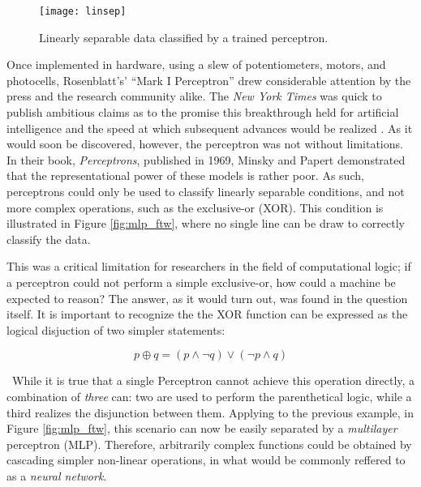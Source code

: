 \begin{figure}
\begin{centering}
\texttt{[image: linsep]}
\caption{Linearly separable data classified by a trained perceptron.}
\label{fig:linsep}
\end{centering}
\end{figure}

Once implemented in hardware, using a slew of potentiometers, motors, and photocells, Rosenblatt's' ``Mark I Perceptron'' drew considerable attention by the press and the research community alike.
The \emph{New York Times} was quick to publish ambitious claims as to the promise this breakthrough held for artificial intelligence and the speed at which subsequent advances would be realized \cite{}.
As it would soon be discovered, however, the perceptron was not without limitations.
In their book, \emph{Perceptrons}, published in 1969, Minsky and Papert demonstrated that the representational power of these models is rather poor.
As such, perceptrons could only be used to classify linearly separable conditions, and not more complex operations, such as the exclusive-or (XOR).
This condition is illustrated in Figure \ref{fig:mlp_ftw}, where no single line can be draw to correctly classify the data.

This was a critical limitation for researchers in the field of computational logic; if a perceptron could not perform a simple exclusive-or, how could a machine be expected to reason?
The answer, as it would turn out, was found in the question itself.
It is important to recognize the the XOR function can be expressed as the logical disjuction of two simpler statements:

\begin{equation}
\label{eq:xor}
p \oplus q = (p \wedge \neg q) \vee (\neg p \wedge q)
\end{equation}

\noindent~While it is true that a single Perceptron cannot achieve this operation directly, a combination of \emph{three} can: two are used to perform the parenthetical logic, while a third realizes the disjunction between them.
Applying to the previous example, in Figure \ref{fig:mlp_ftw}, this scenario can now be easily separated by a \emph{multilayer} perceptron (MLP).
Therefore, arbitrarily complex functions could be obtained by cascading simpler non-linear operations, in what would be commonly reffered to as a \emph{neural network}.


